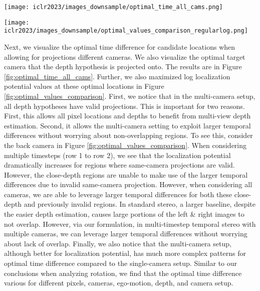 \documentclass[runningheads, hyperfootnotes=false]{article}
\begin{document}
\begin{figure*}[t]
  \centering
  \texttt{[image: iclr2023/images\_downsample/optimal\_time\_all\_cams.png]}
  \captionsetup{aboveskip=0pt}\captionsetup{belowskip=0pt}\caption{Allowing projections of depth hypotheses between different cameras, we visualize the optimal time difference in the first row. The second row shows the target camera that the depth hypothesis was projected onto to maximize localization potential. The cameras are labeled 0 to 5 in the order of front-left to back-left.}
  \label{fig:optimal_time_all_cams}
\end{figure*} \begin{figure*}[t]
  \centering
  \texttt{[image: iclr2023/images\_downsample/optimal\_values\_comparison\_regularlog.png]}
  \captionsetup{aboveskip=0pt}\captionsetup{belowskip=0pt}\caption{Log of maximized localization potential values are visualized for single-timestep with same-camera projections in row 1. Row 2 shows multi-timestep same camera projections, and row 3 shows multi-timestep, multi-camera projections. Note each vertical column has same scale}
  \label{fig:optimal_values_comparison}
\end{figure*} Next, we visualize the optimal time difference for candidate locations when allowing for projections different cameras. We also visualize the optimal target camera that the depth hypothesis is projected onto. The results are in Figure \ref{fig:optimal_time_all_cams}. Further, we also maximized log localization potential values at these optimal locations in Figure \ref{fig:optimal_values_comparison}. First, we notice that in the multi-camera setup, all depth hypotheses have valid projections. This is important for two reasons. First, this allows all pixel locations and depths to benefit from multi-view depth estimation. Second, it allows the multi-camera setting to exploit larger temporal differences without worrying about non-overlapping regions. To see this, consider the back camera in Figure \ref{fig:optimal_values_comparison}. When considering multiple timesteps (row 1 to row 2), we see that the localization potential dramatically increases for regions where same-camera projections are valid. However, the close-depth regions are unable to make use of the larger temporal differences due to invalid same-camera projection. However, when considering all cameras, we are able to leverage larger temporal differences for both these close-depth and previously invalid regions. In standard stereo, a larger baseline, despite the easier depth estimation, causes large portions of the left \& right images to not overlap. However, via our formulation, in multi-timestep temporal stereo with multiple cameras, we can leverage larger temporal differences without worrying about lack of overlap. Finally, we also notice that the multi-camera setup, although better for localization potential, has much more complex patterns for optimal time difference compared to the single-camera setup. Similar to our conclusions when analyzing rotation, we find that the optimal time difference various for different pixels, cameras, ego-motion, depth, and camera setup.
\end{document}
